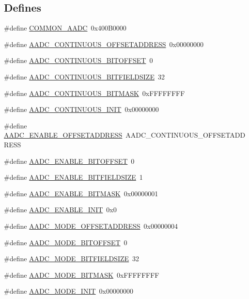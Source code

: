 \subsection*{Defines}
\begin{DoxyCompactItemize}
\item 
\#define \hyperlink{a00543_a1e252a0c2d41bcd61c87fae353d141c6}{COMMON\_\-AADC}~0x400B0000
\item 
\#define \hyperlink{a00543_a24c16b6e875b66484cec1aae79fed677}{AADC\_\-CONTINUOUS\_\-OFFSETADDRESS}~0x00000000
\item 
\#define \hyperlink{a00543_a3c4eb418321e9a6388a1d5f3f3c336ee}{AADC\_\-CONTINUOUS\_\-BITOFFSET}~0
\item 
\#define \hyperlink{a00543_acf04de174f3f0354487b7823f09e2bd2}{AADC\_\-CONTINUOUS\_\-BITFIELDSIZE}~32
\item 
\#define \hyperlink{a00543_a622b81b6cbdf4faddfe6cb293953416b}{AADC\_\-CONTINUOUS\_\-BITMASK}~0xFFFFFFFF
\item 
\#define \hyperlink{a00543_a2464f6380ebc0317b703afb45cda8bfd}{AADC\_\-CONTINUOUS\_\-INIT}~0x00000000
\item 
\#define \hyperlink{a00543_a462e7a4aa146f1f782392cb7c760eab6}{AADC\_\-ENABLE\_\-OFFSETADDRESS}~AADC\_\-CONTINUOUS\_\-OFFSETADDRESS
\item 
\#define \hyperlink{a00543_a46eb5fba4e0e270568f60c0a10a35219}{AADC\_\-ENABLE\_\-BITOFFSET}~0
\item 
\#define \hyperlink{a00543_a27f8f2604f9c6feb5c249f24333cb2bf}{AADC\_\-ENABLE\_\-BITFIELDSIZE}~1
\item 
\#define \hyperlink{a00543_a6f546cf40b51f99e6428841ff85eaebd}{AADC\_\-ENABLE\_\-BITMASK}~0x00000001
\item 
\#define \hyperlink{a00543_a34b7cf1b93fa9a0eaf1e417b10cdb7af}{AADC\_\-ENABLE\_\-INIT}~0x0
\item 
\#define \hyperlink{a00543_a6833027d306ecf4b3909f0502e55615a}{AADC\_\-MODE\_\-OFFSETADDRESS}~0x00000004
\item 
\#define \hyperlink{a00543_aba816cf8c693280403c25a24e7358e1f}{AADC\_\-MODE\_\-BITOFFSET}~0
\item 
\#define \hyperlink{a00543_a165cb54d95a5a3fd1d23308e77449776}{AADC\_\-MODE\_\-BITFIELDSIZE}~32
\item 
\#define \hyperlink{a00543_af81c08e73840feb9e937ce6eca36bf30}{AADC\_\-MODE\_\-BITMASK}~0xFFFFFFFF
\item 
\#define \hyperlink{a00543_ad79d8f595b8ad87bd715c075dff02a70}{AADC\_\-MODE\_\-INIT}~0x00000000
\item 

\end{DoxyCompactItemize}
